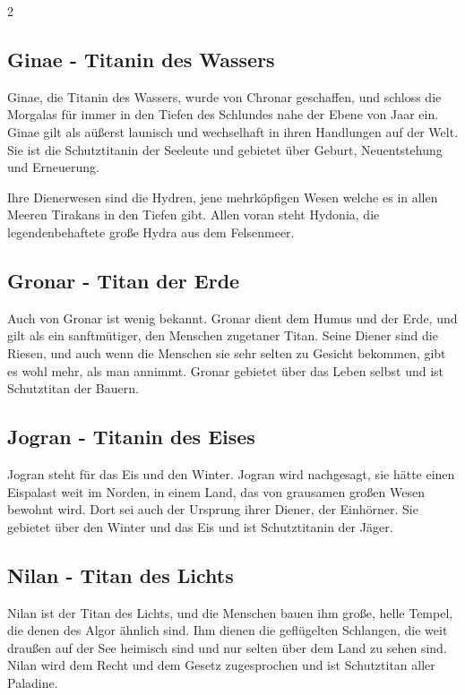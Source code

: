 \begin{multicols*}{2}
\subsection{Ginae - Titanin des Wassers}\label{subsec:ginae-titanin-des-wassers}

Ginae, die Titanin des Wassers, wurde von Chronar geschaffen, und schloss die Morgalas für immer in den Tiefen des Schlundes nahe der Ebene von Jaar ein.
Ginae gilt als aüßerst launisch und wechselhaft in ihren Handlungen auf der Welt.
Sie ist die Schutztitanin der Seeleute und gebietet über Geburt, Neuentstehung und Erneuerung.

Ihre Dienerwesen sind die Hydren, jene mehrköpfigen Wesen welche es in allen Meeren Tirakans in den Tiefen gibt.
Allen voran steht Hydonia, die legendenbehaftete große Hydra aus dem Felsenmeer.

\subsection{Gronar - Titan der Erde}\label{subsec:gronar-titan-der-erde}

Auch von Gronar ist wenig bekannt.
Gronar dient dem Humus und der Erde, und gilt als ein sanftmütiger, den Menschen zugetaner Titan.
Seine Diener sind die Riesen, und auch wenn die Menschen sie sehr selten zu Gesicht bekommen, gibt es wohl mehr, als man annimmt.
Gronar gebietet über das Leben selbst und ist Schutztitan der Bauern.

\subsection{Jogran - Titanin des Eises}\label{subsec:jogran-titanin-des-eises}

Jogran steht für das Eis und den Winter.
Jogran wird nachgesagt, sie hätte einen Eispalast weit im Norden, in einem Land, das von grausamen großen Wesen bewohnt wird.
Dort sei auch der Ursprung ihrer Diener, der Einhörner.
Sie gebietet über den Winter und das Eis und ist Schutztitanin der Jäger.

\subsection{Nilan - Titan des Lichts}\label{subsec:nilan-titan-des-lichts}

Nilan ist der Titan des Lichts, und die Menschen bauen ihm große, helle Tempel, die denen des Algor ähnlich sind.
Ihm dienen die geflügelten Schlangen, die weit draußen auf der See heimisch sind und nur selten über dem Land zu sehen sind.
Nilan wird dem Recht und dem Gesetz zugesprochen und ist Schutztitan aller Paladine.


\end{multicols*}
